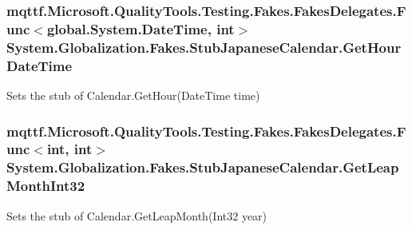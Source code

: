 \hypertarget{class_system_1_1_globalization_1_1_fakes_1_1_stub_japanese_calendar_a513f8a236c8f2a76b2251312864a4912}{
\subsubsection[{Get\-Hour\-Date\-Time}]{\setlength{\rightskip}{0pt plus 5cm}mqttf.\-Microsoft.\-Quality\-Tools.\-Testing.\-Fakes.\-Fakes\-Delegates.\-Func$<$global.\-System.\-Date\-Time, int$>$ System.\-Globalization.\-Fakes.\-Stub\-Japanese\-Calendar.\-Get\-Hour\-Date\-Time}}\label{class_system_1_1_globalization_1_1_fakes_1_1_stub_japanese_calendar_a513f8a236c8f2a76b2251312864a4912}


Sets the stub of Calendar.\-Get\-Hour(\-Date\-Time time)

\hypertarget{class_system_1_1_globalization_1_1_fakes_1_1_stub_japanese_calendar_a0fa95718957031ec1a861bcc6149bb27}{
\subsubsection[{Get\-Leap\-Month\-Int32}]{\setlength{\rightskip}{0pt plus 5cm}mqttf.\-Microsoft.\-Quality\-Tools.\-Testing.\-Fakes.\-Fakes\-Delegates.\-Func$<$int, int$>$ System.\-Globalization.\-Fakes.\-Stub\-Japanese\-Calendar.\-Get\-Leap\-Month\-Int32}}\label{class_system_1_1_globalization_1_1_fakes_1_1_stub_japanese_calendar_a0fa95718957031ec1a861bcc6149bb27}


Sets the stub of Calendar.\-Get\-Leap\-Month(\-Int32 year)

